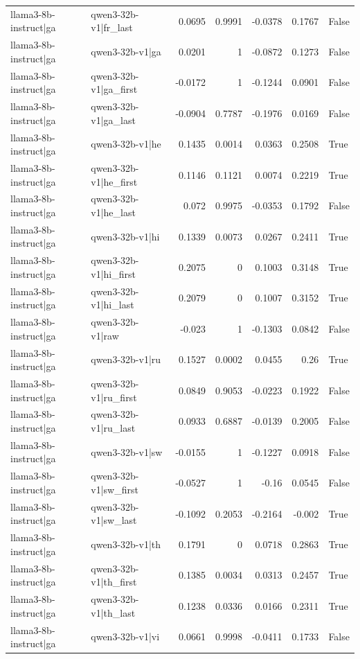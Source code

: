 \begin{table}
\begin{tabular}{l l r r r r l}
llama3-8b-instruct|ga & qwen3-32b-v1|fr_last & 0.0695 & 0.9991 & -0.0378 & 0.1767 & False \\
llama3-8b-instruct|ga & qwen3-32b-v1|ga & 0.0201 & 1 & -0.0872 & 0.1273 & False \\
llama3-8b-instruct|ga & qwen3-32b-v1|ga_first & -0.0172 & 1 & -0.1244 & 0.0901 & False \\
llama3-8b-instruct|ga & qwen3-32b-v1|ga_last & -0.0904 & 0.7787 & -0.1976 & 0.0169 & False \\
llama3-8b-instruct|ga & qwen3-32b-v1|he & 0.1435 & 0.0014 & 0.0363 & 0.2508 & True \\
llama3-8b-instruct|ga & qwen3-32b-v1|he_first & 0.1146 & 0.1121 & 0.0074 & 0.2219 & True \\
llama3-8b-instruct|ga & qwen3-32b-v1|he_last & 0.072 & 0.9975 & -0.0353 & 0.1792 & False \\
llama3-8b-instruct|ga & qwen3-32b-v1|hi & 0.1339 & 0.0073 & 0.0267 & 0.2411 & True \\
llama3-8b-instruct|ga & qwen3-32b-v1|hi_first & 0.2075 & 0 & 0.1003 & 0.3148 & True \\
llama3-8b-instruct|ga & qwen3-32b-v1|hi_last & 0.2079 & 0 & 0.1007 & 0.3152 & True \\
llama3-8b-instruct|ga & qwen3-32b-v1|raw & -0.023 & 1 & -0.1303 & 0.0842 & False \\
llama3-8b-instruct|ga & qwen3-32b-v1|ru & 0.1527 & 0.0002 & 0.0455 & 0.26 & True \\
llama3-8b-instruct|ga & qwen3-32b-v1|ru_first & 0.0849 & 0.9053 & -0.0223 & 0.1922 & False \\
llama3-8b-instruct|ga & qwen3-32b-v1|ru_last & 0.0933 & 0.6887 & -0.0139 & 0.2005 & False \\
llama3-8b-instruct|ga & qwen3-32b-v1|sw & -0.0155 & 1 & -0.1227 & 0.0918 & False \\
llama3-8b-instruct|ga & qwen3-32b-v1|sw_first & -0.0527 & 1 & -0.16 & 0.0545 & False \\
llama3-8b-instruct|ga & qwen3-32b-v1|sw_last & -0.1092 & 0.2053 & -0.2164 & -0.002 & True \\
llama3-8b-instruct|ga & qwen3-32b-v1|th & 0.1791 & 0 & 0.0718 & 0.2863 & True \\
llama3-8b-instruct|ga & qwen3-32b-v1|th_first & 0.1385 & 0.0034 & 0.0313 & 0.2457 & True \\
llama3-8b-instruct|ga & qwen3-32b-v1|th_last & 0.1238 & 0.0336 & 0.0166 & 0.2311 & True \\
llama3-8b-instruct|ga & qwen3-32b-v1|vi & 0.0661 & 0.9998 & -0.0411 & 0.1733 & False \\

\end{tabular}
\end{table}
